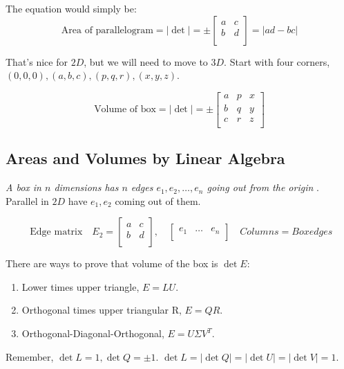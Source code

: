 The equation would simply be: 
\[
  \text{Area of parallelogram} = \vert \det  \vert = 
  \pm 
  \begin{bmatrix}
    a & c  \\
    b & d  \\
  \end{bmatrix}
  = \vert ad - bc \vert 
\]

That's nice for \(2D\), but we will need to move to \(3D\). Start with four corners, \((0, 0, 0), (a, b, c), (p, q, r), (x, y, z)\). 

\[
  \text{Volume of box} = \vert \det  \vert = \pm 
  \begin{bmatrix}
    a & p & x  \\
    b & q & y  \\
    c & r & z  \\
  \end{bmatrix} 
\]

\subsection{Areas and Volumes by Linear Algebra}

\emph{A box in \(n\) dimensions has \(n\) edges \(e_1, e_2, \ldots, e_n\) going out from the origin  }. Parallel in \(2D\) have \(e_1, e_2\) coming out of them. 

\[
  \text{ Edge matrix} \quad 
  E_2 = 
  \begin{bmatrix}
    a & c  \\
    b & d  \\
  \end{bmatrix}, \quad 
  \begin{bmatrix}
    e_1 & \ldots & e_n  \\
  \end{bmatrix} \quad 
  Columns = Box edges
\]

There are ways to prove that volume of the box is \(\det E\): 
\begin{enumerate}
  \item Lower times upper triangle, \(E = LU\). 
  \item Orthogonal times upper triangular R, \(E = QR\).
  \item Orthogonal-Diagonal-Orthogonal, \(E = U \Sigma V^T\).    
\end{enumerate} 

Remember, \(\det L = 1, \det Q = \pm 1\). \(\det L = \vert \det Q \vert = \vert \det U \vert = \vert \det V \vert = 1  \). 

